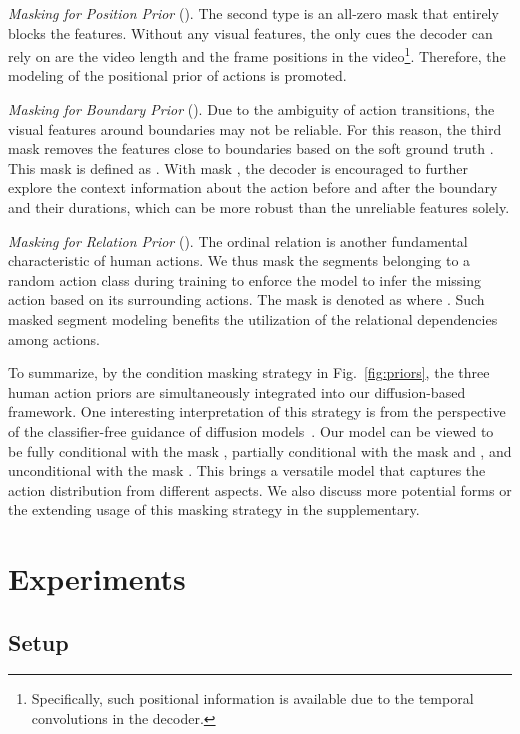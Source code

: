 \documentclass[10pt,twocolumn,letterpaper]{article}
\begin{document}
\textit{Masking for Position Prior} (). 
The second type is an all-zero mask  that entirely blocks the features.
Without any visual features, the only cues the decoder can rely on are the video length and the frame positions in the video\footnote{Specifically, such positional information is available due to the temporal convolutions in the decoder.}. 
Therefore, the modeling of the positional prior of actions is promoted.


\textit{Masking for Boundary Prior} (). 
Due to the ambiguity of action transitions, the visual features around boundaries may not be reliable.
For this reason, the third mask  removes the features close to boundaries based on the soft ground truth .
This mask is defined as .
With mask , the decoder is encouraged to further explore the context information about the action before and after the boundary and their durations, which can be more robust than the unreliable features solely.

\textit{Masking for Relation Prior} (). 
The ordinal relation is another fundamental characteristic of human actions. 
We thus mask the segments belonging to a random action class  during training to enforce the model to infer the missing action based on its surrounding actions.
The mask is denoted as  where .
Such masked segment modeling benefits the utilization of the relational dependencies among actions.

To summarize, by the condition masking strategy in Fig.~\ref{fig:priors}, the three human action priors are simultaneously integrated into our diffusion-based framework.
One interesting interpretation of this strategy is from the perspective of the classifier-free guidance of diffusion models~\cite{CFGuidance}.
Our model can be viewed to be fully conditional with the mask , partially conditional with the mask  and , and unconditional with the mask .
This brings a versatile model that captures the action distribution from different aspects.
We also discuss more potential forms or the extending usage of this masking strategy in the supplementary.






\section{Experiments}

\subsection{Setup}
\end{document}
